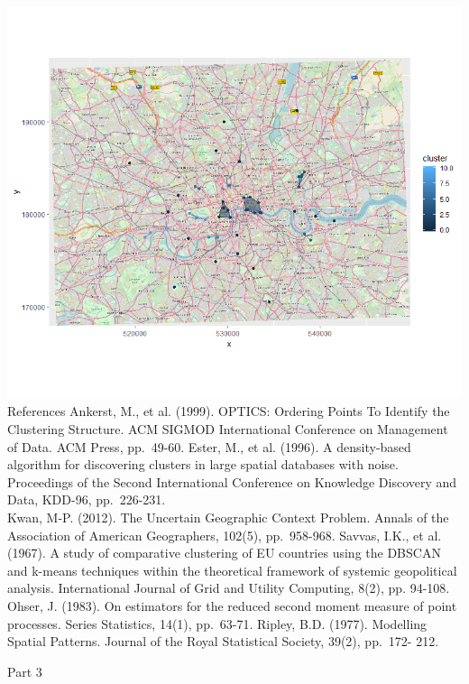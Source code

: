 \documentclass[]{article}
\begin{document}
\includegraphics[width=11.17in]{10} References Ankerst, M., et al.
(1999). OPTICS: Ordering Points To Identify the Clustering Structure.
ACM SIGMOD International Conference on Management of Data. ACM Press,
pp.~49-60. Ester, M., et al. (1996). A density-based algorithm for
discovering clusters in large spatial databases with noise. Proceedings
of the Second International Conference on Knowledge Discovery and Data,
KDD-96, pp.~226-231.\\
Kwan, M-P. (2012). The Uncertain Geographic Context Problem. Annals of
the Association of American Geographers, 102(5), pp.~958-968. Savvas,
I.K., et al. (1967). A study of comparative clustering of EU countries
using the DBSCAN and k-means techniques within the theoretical framework
of systemic geopolitical analysis. International Journal of Grid and
Utility Computing, 8(2), pp. 94-108. Ohser, J. (1983). On estimators for
the reduced second moment measure of point processes. Series Statistics,
14(1), pp.~63-71. Ripley, B.D. (1977). Modelling Spatial Patterns.
Journal of the Royal Statistical Society, 39(2), pp.~172- 212.

Part 3
\end{document}
